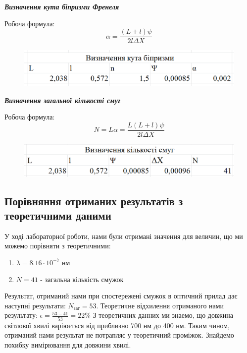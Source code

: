 \newpage
\begin{center}
  {\textbf{\emph{Визначення кута біпризми Френеля}}}
\end{center}
\indent Робоча формула:
$$\alpha = \frac{(L+l)\psi}{2l \Delta X}$$
\begin{figure}[ht]

\centering

\includegraphics[width=0.6\linewidth]{Pics/alpha.png}


\label{alphs}

\end{figure}
\begin{center}
  {\textbf{\emph{Визначення загальної кількості смуг}}}
\end{center}
\indent Робоча формула:
$$N = L\alpha = \frac{L(L+l)\psi}{2l \Delta X}$$
\begin{figure}[ht]

\centering

\includegraphics[width=0.6\linewidth]{Pics/count.png}


\label{count}

\end{figure}
\newpage
\subsection{Порівняння отриманих результатів з теоретичними даними}
\indent У ході лабораторної роботи, нами були отримані значення для величин, що ми можемо порівняти з теоретичними:
\begin{enumerate}
  \item $\lambda = 8.16 \cdot 10^{-7}$ нм
  \item $N = 41$ - загальна кількість смужок
\end{enumerate}
Результат, отриманий нами при спостережені смужок в оптичний прилад дає наступні результати: $N_{заг} = 53$. Теоретичне відхилення отриманого нами результату: $\epsilon = \frac{53-41}{53} = 22\%$
З теоретичних данних ми знаемо, що довжина світлової хвилі варіюється від приблизно 700 нм до 400 нм. Таким чином, отриманий нами результат не потрапляє у  теоретичний проміжок. Знайдемо похибку вимірювання для довжини хвилі.\\
